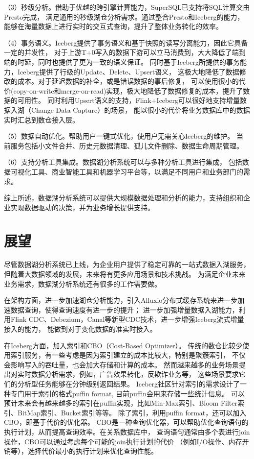 （3）秒级分析。借助于优越的跨引擎计算能力，SuperSQL已支持将SQL计算交由Presto完成，
满足通用的秒级湖仓分析需求。通过整合Presto和Iceberg的能力，能够在海量数据上进行实时的交互式查询，提升了整体业务转化的效率。

（4）事务语义。Iceberg提供了事务语义和基于快照的读写分离能力，因此它具备一定的并发性，
对于上游T+0写入的数据下游可以立马消费到，大大降低了端到端的时延，同时也提供了更为一致的语义保证。
同时基于Iceberg所提供的事务能力，Iceberg提供了行级的Update、Delete、Upsert语义，
这极大地降低了数据修改的成本。对于延迟数据的补全，或是错误数据的事后修复，
可以使用很小的代价(copy-on-write和merge-on-read)实现，极大地降低了数据修复的成本，提升了数据的可用性。
同时利用Upsert语义的支持，Flink+Iceberg可以很好地支持增量数据入湖（Change Data Capture）的场景，
能以很小的代价将业务数据库中的数据实时汇总到数仓接入层。

（5）数据自动优化。帮助用户一键式优化，使用户无需关心Iceberg的维护。
当前服务包括小文件合并、历史元数据清理、孤儿文件删除、数据生命周期管理。

（6）支持分析工具集成。数据湖分析系统可以与多种分析工具进行集成，
包括数据可视化工具、商业智能工具和机器学习平台等，以满足不同用户和业务部门的需求。

综上所述，数据湖分析系统可以提供大规模数据处理和分析的能力，支持组织和企业实现数据驱动的决策，并为业务增长提供支持。

\section{展望}

尽管数据湖分析系统已上线，为企业用户提供了稳定可靠的一站式数据入湖服务，
但随着大数据领域的发展，未来将有更多应用场景和技术挑战。
为满足企业未来业务需求，数据湖分析系统还有很多的工作需要做。

在架构方面，进一步加速湖仓分析能力，引入Alluxio分布式缓存系统来进一步加速数据查询，使得查询速度有进一步的提升；
进一步加强增量数据入湖能力，利用Flink CDC、Debezium，Canal等新型CDC技术，进一步增强Iceberg流式增量接入的能力，
能做到对于变化数据的准实时接入。

在Iceberg方面，加入索引和CBO（Cost-Based Optimizer）。
传统的数仓比较少使用索引服务，有一些考虑是因为索引建立的成本比较大，特别是聚簇索引，
不仅会影响写入的吞吐量，也会加大存储和计算的成本。
然而越来越多的业务场景提出对实时数据分析需求，例如，广告效果转化，反欺诈业务等，
这些场景要求它们的分析型任务能够在分钟级别返回结果。
Iceberg社区针对索引的需求设计了一种专门用于索引的格式puffin format, 目前puffin会用来存储一些统计信息。
可以预计未来会有越来越多的索引在puffin实现，比如Min-Max索引、Bloom Filter索引、BitMap索引、Bucket索引等等。
除了索引，利用puffin format，还可以加入CBO，即基于代价的优化器。
CBO是一种查询优化器，可以帮助优化查询语句的执行计划，从而提高查询效率。在关系数据库中，
查询语句通常由多个表进行join操作，CBO可以通过考虑每个可能的join执行计划的代价
（例如I/O操作、内存开销等），选择代价最小的执行计划来优化查询性能。

